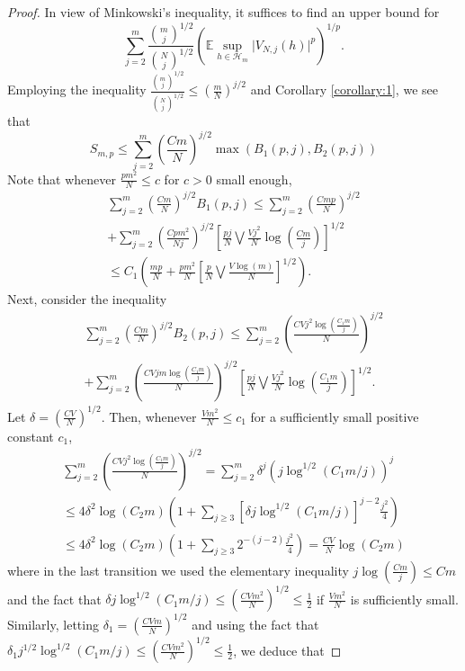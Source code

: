 \documentclass[10pt,a4paper]{amsart}
\def\l{\left}
\newcommand{\mb}{\mathbb}
\def\r{\right}
\begin{document}
\begin{proof}
    In view of Minkowski's inequality, it suffices to find an upper bound for
    \[
    \sum_{j=2}^m \frac{{m \choose j}^{1/2}}{{N\choose j}^{1/2}}\l(\mb E \sup_{h \in \mathcal{H}_m} \lvert V_{N,j}(h) \rvert^p \r)^{1/p}.
    \]
Employing the inequality $\frac{{m \choose j}^{1/2}}{{N\choose j}^{1/2}}\leq \l(\frac{m}{N}\r)^{j/2}$ and Corollary \ref{corollary:1}, we see that 
\[
S_{m,p}\leq \sum_{j=2}^m \l(\frac{Cm}{N}\r)^{j/2}\max\l( B_1(p,j),B_2(p,j)\r)
\]
Note that whenever $\frac{pm^2}{N}\leq c$ for $c>0$ small enough,
\begin{multline}
\label{eq:B_1}
\sum_{j=2}^m \l(\frac{Cm}{N}\r)^{j/2} B_1(p,j)
\leq 
\sum_{j=2}^m \l(\frac{Cmp}{N}\r)^{j/2}
\\
+ \sum_{j=2}^m \l(\frac{Cpm^2}{Nj}\r)^{j/2} \l[\frac{pj}{N}\bigvee \frac{Vj^2}{N}\log\l(\frac{Cm}{j}\r)\r]^{1/2}
\\
\leq C_1\l( \frac{mp}{N} + \frac{pm^2}{N} \l[\frac{p}{N}\bigvee \frac{V\log(m)}{N}\r]^{1/2}\r).
\end{multline}
Next, consider the inequality
\begin{multline*}
    \sum_{j=2}^m \l(\frac{Cm}{N}\r)^{j/2} B_2(p,j) \leq 
    \sum_{j=2}^m \l(\frac{CVj^2 \log\l( \frac{C_1m}{j} \r)}{N}\r)^{j/2}
    \\
    +\sum_{j=2}^m \l(\frac{CVjm\log\l( \frac{C_1m}{j} \r)}{N}\r)^{j/2}\l[\frac{pj}{N}\bigvee \frac{Vj^2}{N}\log\l(\frac{C_1m}{j}\r)\r]^{1/2}.
\end{multline*}
Let $\delta=\l(\frac{CV}{N}\r)^{1/2}$. Then, whenever $\frac{Vm^2}{N}\leq c_1$ for a sufficiently small positive constant $c_1$,
\begin{multline*}    
\sum_{j=2}^m \l(\frac{CVj^2 \log\l( \frac{C_1m}{j} \r)}{N}\r)^{j/2} = \sum_{j=2}^m \delta^j \l(j\log^{1/2}\l(C_1m/j\r)\r)^j 
\\
\leq 4\delta^2 \log\l(C_2 m\r) \l(1 + \sum_{j\geq 3} \l[\delta j \log^{1/2}\l(C_1m/j\r)\r]^{j-2}\frac{j^2}{4}\r)
\\ 
\leq 4\delta^2 \log\l(C_2 m\r)\l( 1+ \sum_{j\geq 3} 2^{-(j-2)}\frac{j^2}{4}\r) = \frac{CV}{N} \log\l(C_2 m\r)
\end{multline*}
where in the last transition we used the elementary inequality $j\log\l(\frac{Cm}{j}\r)\leq Cm$ and the fact that $\delta j \log^{1/2}\l(C_1m/j\r) \leq \l(\frac{CVm^2}{N}\r)^{1/2}\leq \frac{1}{2}$ if $\frac{Vm^2}{N}$ is sufficiently small. 
Similarly, letting $\delta_1 = \l(\frac{CVm}{N} \r)^{1/2}$ and using the fact that $\delta_1 j^{1/2} \log^{1/2}\l(C_1m/j\r)\leq \l( \frac{CVm^2}{N}\r)^{1/2}\leq \frac 12$, we deduce that

\end{proof}
\end{document}
